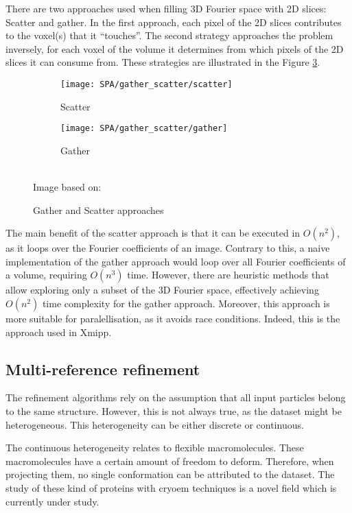 \documentclass[../main.tex]{subfiles}
\begin{document}
There are two approaches used when filling 3D Fourier space with 2D slices: Scatter and gather. In the first approach, each pixel of the 2D slices contributes to the voxel(s) that it ``touches''. The second strategy approaches the problem inversely, for each voxel of the volume it determines from which pixels of the 2D slices it can consume from\cite{strelak2019}. These strategies are illustrated in the Figure \ref{fig:3:gather_scatter}.

\begin{figure}[htbp]
    \centering
    \begin{subfigure}[b]{0.45\textwidth}
         \centering
         \texttt{[image: SPA/gather\_scatter/scatter]}
         \caption{Scatter}
         \label{fig:4:gather_scatter:scatter}
    \end{subfigure}
    \begin{subfigure}[b]{0.45\textwidth}
         \centering
         \texttt{[image: SPA/gather\_scatter/gather]}
         \caption{Gather}
         \label{fig:4:gather_scatter:gather}
    \end{subfigure}\\
    Image based on: \cite{strelak2019}
    \caption{Gather and Scatter approaches}
    \label{fig:3:gather_scatter}
\end{figure}

The main benefit of the scatter approach is that it can be executed in $O(n^2)$, as it loops over the Fourier coefficients of an image. Contrary to this, a naive implementation of the gather approach would loop over all Fourier coefficients of a volume, requiring $O(n^3)$ time\cite{strelak2019}. However, there are heuristic methods that allow exploring only a subset of the 3D Fourier space, effectively achieving $O(n^2)$ time complexity for the gather approach. Moreover, this approach is more suitable for paralellisation, as it avoids race conditions. Indeed, this is the approach used in Xmipp\cite{strelak2019}. 

\subsection{Multi-reference refinement}
The refinement algorithms rely on the assumption that all input particles belong to the same structure. However, this is not always true, as the dataset might be heterogeneous. This heterogeneity can be either discrete or continuous. 

The continuous heterogeneity relates to flexible macromolecules. These macromolecules have a certain amount of freedom to deform. Therefore, when projecting them, no single conformation can be attributed to the dataset. The study of these kind of proteins with \gls{cryoem} techniques is a novel field which is currently under study\cite{herreros2021}.
\end{document}
